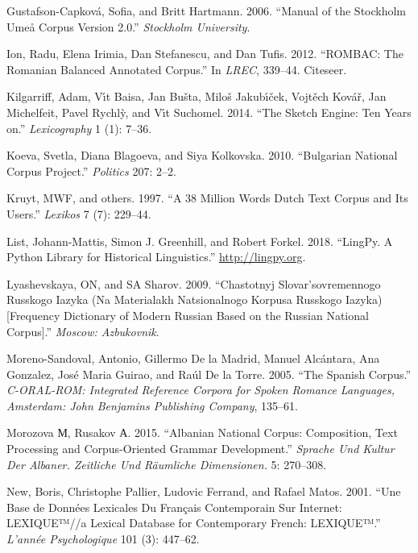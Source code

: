 \documentclass[]{article}
\begin{document}
\leavevmode\hypertarget{ref-gustafson2006manual}{}%
Gustafson-Capková, Sofia, and Britt Hartmann. 2006. ``Manual of the
Stockholm Umeå Corpus Version 2.0.'' \emph{Stockholm University}.

\leavevmode\hypertarget{ref-ion2012rombac}{}%
Ion, Radu, Elena Irimia, Dan Stefanescu, and Dan Tufis. 2012. ``ROMBAC:
The Romanian Balanced Annotated Corpus.'' In \emph{LREC}, 339--44.
Citeseer.

\leavevmode\hypertarget{ref-kilgarriff2014sketch}{}%
Kilgarriff, Adam, Vı́t Baisa, Jan Bušta, Miloš Jakubı́ček, Vojtěch Kovář,
Jan Michelfeit, Pavel Rychlỳ, and Vı́t Suchomel. 2014. ``The Sketch
Engine: Ten Years on.'' \emph{Lexicography} 1 (1): 7--36.

\leavevmode\hypertarget{ref-koeva2010bulgarian}{}%
Koeva, Svetla, Diana Blagoeva, and Siya Kolkovska. 2010. ``Bulgarian
National Corpus Project.'' \emph{Politics} 207: 2--2.

\leavevmode\hypertarget{ref-kruyt199738}{}%
Kruyt, MWF, and others. 1997. ``A 38 Million Words Dutch Text Corpus and
Its Users.'' \emph{Lexikos} 7 (7): 229--44.

\leavevmode\hypertarget{ref-list_lingpy._2018}{}%
List, Johann-Mattis, Simon J. Greenhill, and Robert Forkel. 2018.
``LingPy. A Python Library for Historical Linguistics.''
\url{http://lingpy.org}.

\leavevmode\hypertarget{ref-lyashevskaya2009chastotnyj}{}%
Lyashevskaya, ON, and SA Sharov. 2009. ``Chastotnyj Slovar'sovremennogo
Russkogo Iazyka (Na Materialakh Natsionalnogo Korpusa Russkogo
Iazyka){[}Frequency Dictionary of Modern Russian Based on the Russian
National Corpus{]}.'' \emph{Moscow: Azbukovnik}.

\leavevmode\hypertarget{ref-moreno2005spanish}{}%
Moreno-Sandoval, Antonio, Gillermo De la Madrid, Manuel Alcántara, Ana
Gonzalez, José Maria Guirao, and Raúl De la Torre. 2005. ``The Spanish
Corpus.'' \emph{C-ORAL-ROM: Integrated Reference Corpora for Spoken
Romance Languages, Amsterdam: John Benjamins Publishing Company},
135--61.

\leavevmode\hypertarget{ref-morozova2015albanian}{}%
Morozova М, Rusakov А. 2015. ``Albanian National Corpus: Composition,
Text Processing and Corpus-Oriented Grammar Development.'' \emph{Sprache
Und Kultur Der Albaner. Zeitliche Und Räumliche Dimensionen.} 5:
270--308.

\leavevmode\hypertarget{ref-new2001base}{}%
New, Boris, Christophe Pallier, Ludovic Ferrand, and Rafael Matos. 2001.
``Une Base de Données Lexicales Du Français Contemporain Sur Internet:
LEXIQUE™//a Lexical Database for Contemporary French: LEXIQUE™.''
\emph{L'année Psychologique} 101 (3): 447--62.
\end{document}
